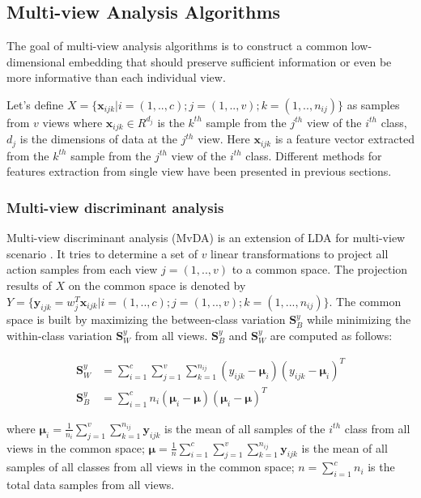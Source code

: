 
\subsection{Multi-view Analysis Algorithms}

    The goal of multi-view analysis algorithms is to construct a common low-dimensional embedding that should preserve sufficient information or even be more informative than each individual view.

    Let's define $X = \{\boldsymbol{x}_{ijk}|i=(1,..,c);j = (1,..,v);k=(1,..,n_{ij})\}$ as samples from $v$ views where $\boldsymbol{x}_{ijk} \in R^{d_j}$ is the $k^{th}$ sample from the $j^{th}$ view of the $i^{th}$ class, $d_j$ is the dimensions of data at the $j^{th}$ view.
    Here ${\boldsymbol x}_{ijk}$ is a feature vector extracted from the $k^{th}$ sample from the $j^{th}$ view of the $i^{th}$ class.
    Different methods for features extraction from single view have been presented in previous sections. 

    \subsubsection{Multi-view discriminant analysis}
        Multi-view discriminant analysis (MvDA) is an extension of LDA for multi-view scenario \cite{kan2015multi}.
        It tries to determine a set of $v$ linear transformations to project all action samples from each view $j = (1,..,v)$ to a common space.
        The projection results of $X$ on the common space is denoted by $Y = \{\boldsymbol{y}_{ijk} = w_j^T\boldsymbol{x}_{ijk}|i=(1,..,c); j=(1,..,v); k=(1,...,n_{ij})\}$.
        The common space is built by maximizing the between-class variation $\boldsymbol{S}_B^y$ while minimizing the within-class variation $\boldsymbol{S}_W^y$ from all views. $\boldsymbol{S}_B^y$ and $\boldsymbol{S}_W^y$ are computed as follows: 

        \begin{align}
            \boldsymbol{S}_W^y &= \sum_{i=1}^{c}\sum_{j=1}^{v}\sum_{k=1}^{n_{ij}}(y_{ijk}-\boldsymbol{\mu}_i)(y_{ijk}-\boldsymbol{\mu}_i)^T \label{eq:MvDA_Sw}\\
            \boldsymbol{S}_B^y &= \sum_{i=1}^{c}n_i(\boldsymbol{\mu}_i - \boldsymbol{\mu})(\boldsymbol{\mu}_i - \boldsymbol{\mu})^T \label{eq:MvDA_Sb}
        \end{align}

        where $\boldsymbol{\mu}_i=\frac{1}{n_i}\sum_{j=1}^{v}{\sum_{k=1}^{n_{ij}}}{\boldsymbol{y}_{ijk}}$ is the mean of all samples of the $i^{th}$ class from all views in the common space; $\boldsymbol{\mu}=\frac{1}{n}\sum_{i=1}^{c}\sum_{j=1}^{v}{\sum_{k=1}^{n_{ij}}{\boldsymbol{y}_{ijk}}}$ is the mean of all samples of all classes from all views in the common space; $n=\sum_{i=1}^{c}n_i$ is the total data samples from all views.

